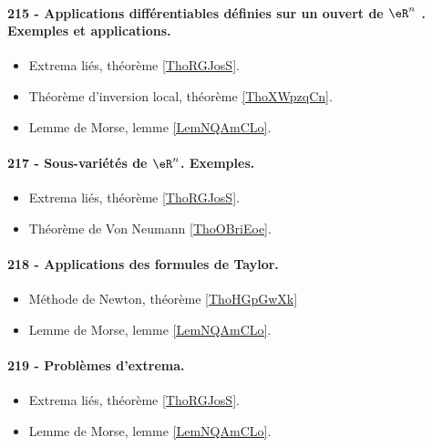 \paragraph{215 - Applications différentiables définies sur un ouvert de $\eR^n$ . Exemples et applications.}
\begin{itemize}
    \item Extrema liés, théorème \ref{ThoRGJosS}.
    \item Théorème d'inversion local, théorème \ref{ThoXWpzqCn}.
    \item Lemme de Morse, lemme \ref{LemNQAmCLo}.
\end{itemize}
\paragraph{217 - Sous-variétés de \( \eR^n\). Exemples.}
\begin{itemize}
    \item Extrema liés, théorème \ref{ThoRGJosS}.
    \item Théorème de Von Neumann \ref{ThoOBriEoe}.
\end{itemize}
\paragraph{218 - Applications des formules de Taylor.}
\begin{itemize}
    \item Méthode de Newton, théorème \ref{ThoHGpGwXk}
    \item Lemme de Morse, lemme \ref{LemNQAmCLo}.
\end{itemize}
\paragraph{219 - Problèmes d’extrema.}
\begin{itemize}
    \item Extrema liés, théorème \ref{ThoRGJosS}.
    \item Lemme de Morse, lemme \ref{LemNQAmCLo}.
\end{itemize}
